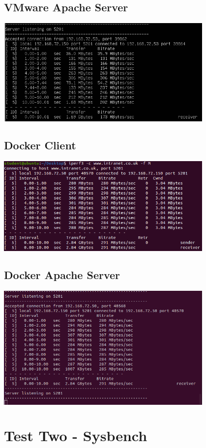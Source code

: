 \documentclass[12pt,twoside]{book}
\begin{document}
\subsection{VMware Apache Server}
\includegraphics[width=0.80\textwidth]{Appendicies/VMwareTest1Apache.PNG}
\subsection{Docker Client}
\includegraphics[width=0.80\textwidth]{Appendicies/DockerTest1Client.PNG}
\subsection{Docker Apache Server}
\includegraphics[width=0.80\textwidth]{Appendicies/DockerTest1Apache.PNG}

\section{Test Two - Sysbench}
\end{document}
